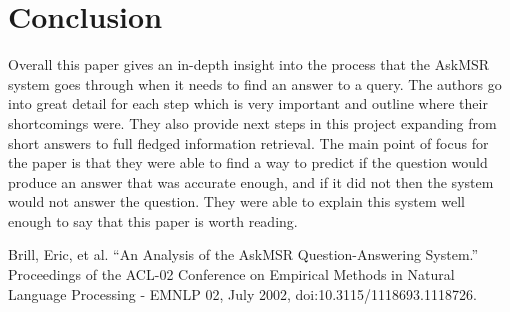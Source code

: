 \documentclass[journal, a4paper]{IEEEtran}
\begin{document}
\section{Conclusion}
Overall this paper gives an in-depth insight into the process that the AskMSR system goes through when it needs to find an answer to a query. The authors go into great detail for each step which is very important and outline where their shortcomings were. They also provide next steps in this project expanding from short answers to full fledged information retrieval. The main point of focus for the paper is that they were able to find a way to predict if the question would produce an answer that was accurate enough, and if it did not then the system would not answer the question. They were able to explain this system well enough to say that this paper is worth reading. 

\begin{thebibliography}{5}

	Brill, Eric, et al. “An Analysis of the AskMSR Question-Answering System.” Proceedings of the ACL-02 Conference on Empirical Methods in Natural Language Processing - EMNLP 02, July 2002, doi:10.3115/1118693.1118726.
\end{thebibliography}
\end{document}
